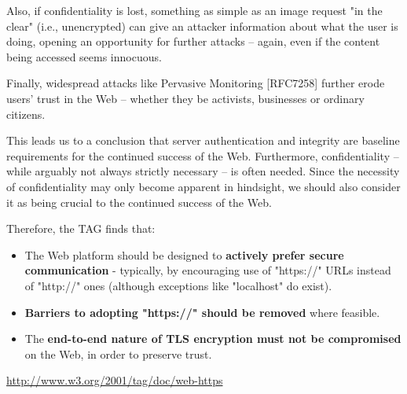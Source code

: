 \begin{introduction}
Also, if confidentiality is lost, something as simple as an image request "in the clear" (i.e., unencrypted) can give an attacker information about what the user is doing, opening an opportunity for further attacks -- again, even if the content being accessed seems innocuous.

Finally, widespread attacks like Pervasive Monitoring [RFC7258] further erode users' trust in the Web -- whether they be activists, businesses or ordinary citizens.

This leads us to a conclusion that server authentication and integrity are baseline requirements for the continued success of the Web. Furthermore, confidentiality -- while arguably not always strictly necessary -- is often needed. Since the necessity of confidentiality may only become apparent in hindsight, we should also consider it as being crucial to the continued success of the Web.

Therefore, the TAG finds that:

\begin{itemize}
  \item The Web platform should be designed to \textbf{actively prefer secure communication} - typically, by encouraging use of "https://" URLs instead of "http://" ones (although exceptions like "localhost" do exist).
  \item \textbf{Barriers to adopting "https://" should be removed} where feasible.
  \item The \textbf{end-to-end nature of TLS encryption must not be compromised} on the Web, in order to preserve trust.
\end{itemize}

\url{http://www.w3.org/2001/tag/doc/web-https}

\end{introduction}
